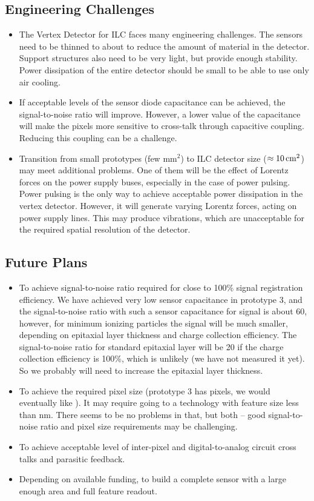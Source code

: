 \subsection{Engineering Challenges}
\begin{itemize}
    \item The Vertex Detector for ILC faces many engineering challenges. The sensors need to be thinned to about \unit[50]{\micron} to reduce the amount of material in the detector. Support structures also need to be very light, but provide enough stability. Power dissipation of the entire detector should be small to be able to use only air cooling.
    \item If acceptable levels of the sensor diode capacitance can be achieved, the signal-to-noise ratio will improve. However, a lower value of the capacitance will make the pixels more sensitive to cross-talk through capacitive coupling. Reducing this coupling can be a challenge.
    \item Transition from small prototypes (few $\text{mm}^{2}$) to ILC detector size ($\approx \unit[10]{cm^2}$) may meet additional problems. One of them will be the effect of Lorentz forces on the power supply buses, especially in the case of power pulsing. Power pulsing is the only way to achieve acceptable power dissipation in the vertex detector. However, it will generate varying Lorentz forces, acting on power supply lines. This may produce vibrations, which are unacceptable for the required spatial resolution of the detector.
\end{itemize}

\subsection{Future Plans}
\begin{itemize}
    \item To achieve signal-to-noise ratio required for close to 100\% signal registration efficiency. We have achieved very low sensor capacitance in prototype 3, and the signal-to-noise ratio with such a sensor capacitance for  signal is about 60, however, for minimum ionizing particles the signal will be much smaller, depending on epitaxial layer thickness and charge collection efficiency. The signal-to-noise ratio for standard \unit[7]{\micron} epitaxial layer will be 20 if the charge collection efficiency is 100\%, which is unlikely (we have not measured it yet). So we probably will need to increase the epitaxial layer thickness.
    \item To achieve the required pixel size (prototype 3 has \unit[25]{\micron} pixels, we would eventually like \unit[15]{\micron}). It may require going to a technology with feature size less than \unit[65]{nm}. There seems to be no problems in that, but both -- good signal-to-noise ratio and pixel size requirements may be challenging.
    \item To achieve acceptable level of inter-pixel and digital-to-analog circuit cross talks and parasitic feedback.
    \item Depending on available funding, to build a complete sensor with a large enough area and full feature readout.
\end{itemize}

